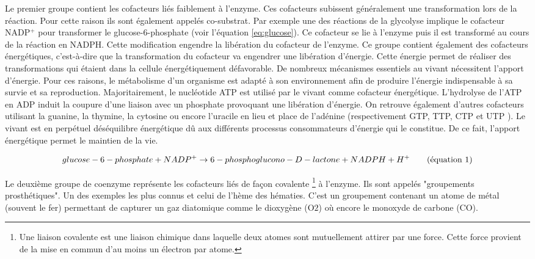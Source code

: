 \begin{refsegment}
    Le premier groupe contient les cofacteurs liés faiblement à l'enzyme. Ces cofacteurs subissent généralement une transformation lors de la réaction. Pour cette raison ils sont également appelés co-substrat. Par exemple une des réactions de la glycolyse implique le cofacteur NADP$^{+}$ pour transformer le glucose-6-phosphate (voir l'équation \ref{eq:glucose}). Ce cofacteur  se lie à l'enzyme puis il est transformé au cours de la réaction en NADPH. Cette modification engendre la libération du cofacteur de l'enzyme. Ce groupe contient également des cofacteurs énergétiques, c'est-à-dire que la transformation du cofacteur va engendrer une libération d'énergie. Cette énergie permet de réaliser des transformations qui étaient dans la cellule énergétiquement défavorable. De nombreux mécanismes essentiels au vivant nécessitent l'apport d'énergie. Pour ces raisons, le métabolisme d'un organisme est adapté à son environnement afin de produire l'énergie indispensable à sa survie et sa reproduction. Majoritairement, le nucléotide \acrfull{ATP} est utilisé par le vivant comme cofacteur énergétique. L'hydrolyse de l'\acrfull{ATP} en \acrfull{ADP} induit la coupure d'une liaison avec un phosphate provoquant une libération d'énergie. On retrouve également d'autres cofacteurs utilisant la guanine, la thymine, la cytosine ou encore l'uracile en lieu et place de l'adénine (respectivement  GTP, TTP, CTP et UTP ). Le vivant est en perpétuel déséquilibre énergétique dû aux différents processus consommateurs d'énergie qui le constitue. De ce fait, l'apport énergétique permet le maintien de la vie.
    
    \begin{equation}\label{eq:glucose}
        glucose-6-phosphate + NADP^{+} \rightarrow 6-phosphoglucono-D-lactone + NADPH + H^{+}
        \stepcounter{equation}\tag{équation \theequation}
    \end{equation}
    
    Le deuxième groupe de coenzyme représente les cofacteurs liés de façon covalente \footnote{Une liaison covalente est une liaison chimique dans laquelle deux atomes sont mutuellement attirer par une force. Cette force provient de la mise en commun d'au moins un électron par atome.} à l'enzyme. Ils sont appelés "groupements prosthétiques". Un des exemples les plus connus et celui de l'hème des hématies. C'est un groupement contenant un atome de métal (souvent le fer) permettant de capturer un gaz diatomique comme le dioxygène (O${2}$) où encore le monoxyde de carbone (CO).
    

\end{refsegment}
